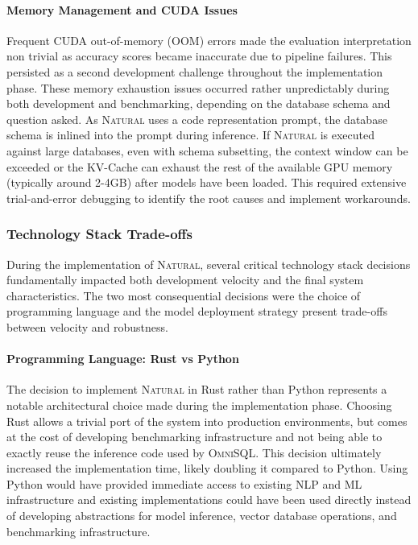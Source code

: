 \paragraph{Memory Management and CUDA Issues}

Frequent CUDA out-of-memory (OOM) errors made the evaluation interpretation non
trivial as accuracy scores became inaccurate due to pipeline failures. This
persisted as a second development challenge throughout the implementation
phase. These memory exhaustion issues occurred rather unpredictably during both
development and benchmarking, depending on the database schema and question
asked. As \textsc{Natural} uses a code representation prompt, the database
schema is inlined into the prompt during inference. If \textsc{Natural} is
executed against large databases, even with schema subsetting, the context
window can be exceeded or the KV-Cache can exhaust the rest of the available
GPU memory (typically around 2-4GB) after models have been loaded. This
required extensive trial-and-error debugging to identify the root causes and
implement workarounds. 

\subsubsection{Technology Stack Trade-offs}

During the implementation of \textsc{Natural}, several critical technology
stack decisions fundamentally impacted both development velocity and the
final system characteristics. The two most consequential decisions were the
choice of programming language and the model deployment strategy present
trade-offs between velocity and robustness.

\paragraph{Programming Language: Rust vs Python}

The decision to implement \textsc{Natural} in Rust rather than Python
represents a notable architectural choice made during the implementation phase.
Choosing Rust allows a trivial port of the system into production environments,
but comes at the cost of developing benchmarking infrastructure and not being
able to exactly reuse the inference code used by \textsc{OmniSQL}. This
decision ultimately increased the implementation time, likely doubling it compared
to Python. Using Python would have provided immediate access to existing NLP
and ML infrastructure and existing implementations could have been used
directly instead of developing abstractions for model inference, vector
database operations, and benchmarking infrastructure.

